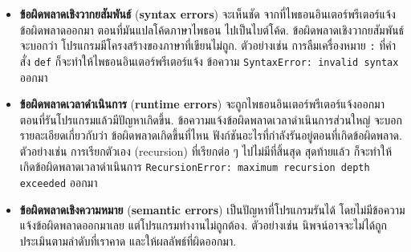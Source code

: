 \begin{itemize}


\item \textbf{ข้อผิดพลาดเชิงวากยสัมพันธ์} (\textbf{syntax errors})
จะเห็นชัด จากที่ไพธอนอินเตอร์พรีเตอร์แจ้งข้อผิดพลาดออกมา
ตอนที่มันแปลโค้ดภาษาไพธอน ไปเป็นไบต์โค้ด.
ข้อผิดพลาดเชิงวากยสัมพันธ์ จะบอกว่า
โปรแกรมมีโครงสร้างของภาษาที่เขียนไม่ถูก.
ตัวอย่างเช่น การลืมเครื่องหมาย \verb|:| ที่คำสั่ง \texttt{def}
ก็จะทำให้ไพธอนอินเตอร์พรีเตอร์แจ้ง ข้อความ
\texttt{SyntaxError: invalid syntax} ออกมา



\item \textbf{ข้อผิดพลาดเวลาดำเนินการ} (\textbf{runtime errors}) จะถูกไพธอนอินเตอร์พรีเตอร์แจ้งออกมา
ตอนที่รันโปรแกรมแล้วมีปัญหาเกิดขึ้น.  
ข้อความแจ้งข้อผิดพลาดเวลาดำเนินการส่วนใหญ่ 
จะบอกรายละเอียดเกี่ยวกับว่า ข้อผิดพลาดเกิดขึ้นที่ไหน 
ฟังก์ชันอะไรที่กำลังรันอยู่ตอนที่เกิดข้อผิดพลาด.
ตัวอย่างเช่น
การเรียกตัวเอง (recursion) ที่เรียกต่อ ๆ ไปไม่มีที่สิ้นสุด 
สุดท้ายแล้ว ก็จะทำให้เกิดข้อผิดพลาดเวลาดำเนินการ 
\texttt{RecursionError: maximum recursion depth exceeded} ออกมา



\item \textbf{ข้อผิดพลาดเชิงความหมาย} (\textbf{semantic errors})
เป็นปัญหาที่โปรแกรมรันได้ โดยไม่มีข้อความแจ้งข้อผิดพลาดออกมาเลย
แต่โปรแกรมทำงานไม่ถูกต้อง.
ตัวอย่างเช่น นิพจน์อาจจะไม่ได้ถูกประเมินตามลำดับที่เราคาด และให้ผลลัพธ์ที่ผิดออกมา.


\end{itemize}

